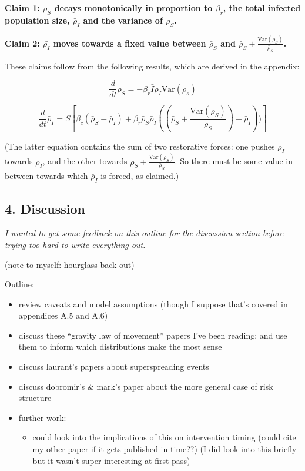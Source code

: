 \textbf{Claim 1: \(\bar\rho_S\) decays monotonically in proportion to
\(\beta_r\), the total infected population size, \(\bar\rho_I\) and the
variance of \(\rho_S\).}

\textbf{Claim 2: \(\bar{\rho_I}\) moves towards a fixed value between
\(\bar\rho_S\) and
\(\bar\rho_S + \frac{\text{Var}(\rho_S)}{\bar\rho_S}\).}

These claims follow from the following results, which are derived in the
appendix:

\[
\frac{d}{dt}\bar\rho_S = -\beta_r \bar I \bar\rho_I \text{Var}(\rho_s)
\]

\[
\frac{d}{dt}\bar\rho_I
= \bar S \left[
    \beta_c (\bar\rho_S - \bar\rho_I)
    + \beta_r \bar\rho_S \bar\rho_I((\bar\rho_S + \frac{\text{Var}(\rho_S)}{\bar\rho_S})
        - \bar\rho_I))\right]
\]

(The latter equation contains the sum of two restorative forces: one
pushes \(\bar\rho_I\) towards \(\bar\rho_I\), and the other towards
\(\bar\rho_S + \frac{\text{Var}(\rho_S)}{\bar\rho_S}\). So there must be
some value in between towards which \(\bar\rho_I\) is forced, as
claimed.)

\subsection{4. Discussion}\label{discussion}

\emph{I wanted to get some feedback on this outline for the discussion
section before trying too hard to write everything out.}

(note to myself: hourglass back out)

Outline:

\begin{itemize}
\item
  review caveats and model assumptions (though I suppose that's covered
  in appendices A.5 and A.6)
\item
  discuss these ``gravity law of movement'' papers I've been reading;
  and use them to inform which distributions make the most sense
\item
  discuss laurant's papers about superspreading events
\item
  discuss dobromir's \& mark's paper about the more general case of risk
  structure
\item
  further work:

  \begin{itemize}
  \tightlist
  \item
    could look into the implications of this on intervention timing
    (could cite my other paper if it gets published in time??) (I did
    look into this briefly but it wasn't super interesting at first
    pass)
  \end{itemize}
\end{itemize}

